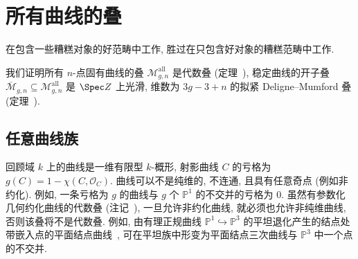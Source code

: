 \section{所有曲线的叠}\label{src:6.4}
\begin{epigraph}
在包含一些糟糕对象的好范畴中工作, 胜过在只包含好对象的糟糕范畴中工作.
\end{epigraph}
我们证明所有 $n$-点固有曲线的叠 $\mathcal M_{g,\allowbreak n}^{\mathrm{all}}$ 是代数叠 (定理~), 稳定曲线的开子叠 $\overline{\mathcal M}_{g,\allowbreak n}\subseteq\mathcal M_{g,\allowbreak n}^{\mathrm{all}}$ 是 $\Spec\mathbb Z$ 上光滑, 维数为 $3g-3+n$ 的拟紧 Deligne--Mumford 叠 (定理~).
\subsection{任意曲线族}\label{src:6.4.1-subsection}
回顾域 $k$ 上的曲线是一维有限型 $k$-概形, 射影曲线 $C$ 的亏格为 $g(C)=1-\chi(C,\allowbreak \mathcal O_C)$. 曲线可以不是纯维的, 不连通, 且具有任意奇点 (例如非约化). 例如, 一条亏格为 $g$ 的曲线与 $g$ 个 $\mathbb P^1$ 的不交并的亏格为 $0$. 虽然有参数化几何约化曲线的代数叠 (注记~), 一旦允许非约化曲线, 就必须也允许非纯维曲线, 否则该叠将不是代数叠. 例如, 由有理正规曲线 $\mathbb P^1\hookrightarrow\mathbb P^3$ 的平坦退化产生的结点处带嵌入点的平面结点曲线~\cite[例 9.8.4]{Har77}, 可在平坦族中形变为平面结点三次曲线与 $\mathbb P^3$ 中一个点的不交并.

